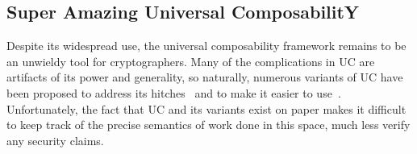 \begin{comment}
To give a quick tour of ILC's type system, judgements have the form $\Delta ; \Gamma |- e
: A |> m$, where $\Delta$ is an affine typing context, $\Gamma$ is an intuitionistic typing
context, and $m \in \{\Wm, \Rm, \Vm\}$ is a mode (write, read, and value,
respectively). Importantly, it maintains these invariants:

\begin{itemize}[leftmargin=*]
\item \emph{No duplication of read channel ends.} Each channel (or ``tape'' in
  ITM parlance) has a read end and a write end. The read end of the channel is
  protected against duplication by binding it in the affine context $\Delta$. This
  ensures that no nondeterminism arises at the receiving end of communications.

\item \emph{No parallel composition of write mode processes.} The typing rules
  do not allow parallel composition of two write mode processes ($\Wm ||
  \Wm$). This ensures that no nondeterminism arises at the sending end of
  communications.
\end{itemize}
\end{comment}


\subsection{Super Amazing Universal ComposabilitY}

 Despite its widespread use, the universal
composability framework remains to be an unwieldy tool for cryptographers. Many
of the complications in UC are artifacts of its power and generality, so
naturally, numerous variants of UC have been proposed to address its
hitches~\cite{backes2007reactive, hofheinz2015gnuc, canetti2007universally,
  canetti2003universal} and to make it easier to
use~\cite{canetti2015simpler}. Unfortunately, the fact that UC and its variants
exist on paper makes it difficult to keep track of the precise semantics of work
done in this space, much less verify any security claims.

